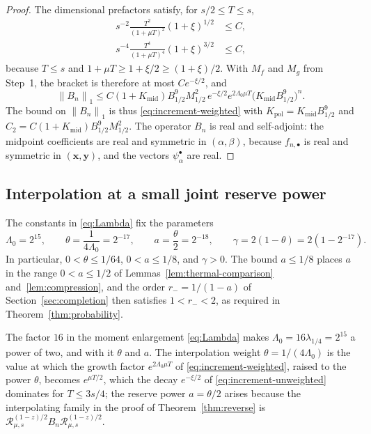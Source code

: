 \documentclass[11pt]{amsart}
\numberwithin{equation}{section}
\theoremstyle{definition}
\newcommand{\JointRes}{\mathcal R}
\newcommand{\bx}{\mathbf x}
\newcommand{\by}{\mathbf y}
\newcommand{\norm}[1]{\left\|#1\right\|}
\begin{document}
\begin{proof}
The dimensional prefactors satisfy, for \(s/2\le T\le s\),
\[
 \begin{split}
 s^{-2}\frac{T^2}{(1+\mu T)^2}(1+\xi)^{1/2}&\le C,\\
 s^{-4}\frac{T^4}{(1+\mu T)^4}(1+\xi)^{3/2}&\le C,
 \end{split}
\]
because \(T\le s\) and \(1+\mu T\ge1+\xi/2\ge(1+\xi)/2\). With
\(M_f\) and \(M_g\) from Step~1, the bracket is therefore at most
\(Ce^{-\xi/2}\), and
\[
 \norm{B_n}_1
 \le C(1+K_{\mathrm{mid}})B_{1/2}^9M_{1/2}^2\,
 e^{-\xi/2}e^{2\Lambda_0\mu T}\bigl(K_{\mathrm{mid}}B_{1/2}^9\bigr)^n .
\]
The bound on \(\norm{B_n}_1\) is thus
\eqref{eq:increment-weighted} with
\(K_{\mathrm{pol}}=K_{\mathrm{mid}}B_{1/2}^9\) and
\(C_2=C(1+K_{\mathrm{mid}})B_{1/2}^9M_{1/2}^2\). The operator
\(B_n\) is real and self-adjoint: the
midpoint coefficients are real and symmetric in \((\alpha,\beta)\),
because \(f_{n,\bullet}\) is real and symmetric in \((\bx,\by)\), and
the vectors \(\psi^\bullet_\alpha\) are real.
\end{proof}

\subsection{Interpolation at a small joint reserve power}

The constants in \eqref{eq:Lambda} fix the parameters
\begin{equation}
 \Lambda_0=2^{15},\qquad
 \theta=\frac1{4\Lambda_0}=2^{-17},\qquad
 a=\frac{\theta}{2}=2^{-18},\qquad
 \gamma=2(1-\theta)=2(1-2^{-17}).
 \label{eq:reverse-exponents}
\end{equation}
In particular, \(0<\theta\le1/64\), \(0<a\le1/8\), and
\(\gamma>0\). The bound \(a\le1/8\) places \(a\) in the range
\(0<a\le1/2\) of Lemmas~\ref{lem:thermal-comparison}
and~\ref{lem:compression}, and the order \(r_-=1/(1-a)\) of
Section~\ref{sec:completion} then satisfies \(1<r_-<2\), as required in
Theorem~\ref{thm:probability}.

The factor \(16\) in the moment enlargement
\eqref{eq:Lambda} makes \(\Lambda_0=16\lambda_{1/4}=2^{15}\) a power of two,
and with it \(\theta\) and \(a\). The interpolation weight
\(\theta=1/(4\Lambda_0)\) is the value at which the growth factor
\(e^{2\Lambda_0\mu T}\) of \eqref{eq:increment-weighted}, raised to
the power \(\theta\), becomes \(e^{\mu T/2}\), which the decay
\(e^{-\xi/2}\) of \eqref{eq:increment-unweighted} dominates for
\(T\le3s/4\); the reserve power \(a=\theta/2\) arises because the
interpolating family in the proof of Theorem~\ref{thm:reverse} is
\(\JointRes_{\mu,s}^{(1-z)/2}B_n\JointRes_{\mu,s}^{(1-z)/2}\).
\end{document}
